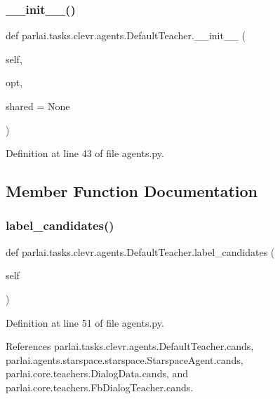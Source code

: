 \subsubsection{\texorpdfstring{\+\_\+\+\_\+init\+\_\+\+\_\+()}{\_\_init\_\_()}}
{\footnotesize\ttfamily def parlai.\+tasks.\+clevr.\+agents.\+Default\+Teacher.\+\_\+\+\_\+init\+\_\+\+\_\+ (\begin{DoxyParamCaption}\item[{}]{self,  }\item[{}]{opt,  }\item[{}]{shared = {\ttfamily None} }\end{DoxyParamCaption})}



Definition at line 43 of file agents.\+py.



\subsection{Member Function Documentation}
\mbox{\label{classparlai_1_1tasks_1_1clevr_1_1agents_1_1DefaultTeacher_a5d5bf049239e335502995a785c292f64}} 
\subsubsection{\texorpdfstring{label\+\_\+candidates()}{label\_candidates()}}
{\footnotesize\ttfamily def parlai.\+tasks.\+clevr.\+agents.\+Default\+Teacher.\+label\+\_\+candidates (\begin{DoxyParamCaption}\item[{}]{self }\end{DoxyParamCaption})}



Definition at line 51 of file agents.\+py.



References parlai.\+tasks.\+clevr.\+agents.\+Default\+Teacher.\+cands, parlai.\+agents.\+starspace.\+starspace.\+Starspace\+Agent.\+cands, parlai.\+core.\+teachers.\+Dialog\+Data.\+cands, and parlai.\+core.\+teachers.\+Fb\+Dialog\+Teacher.\+cands.

